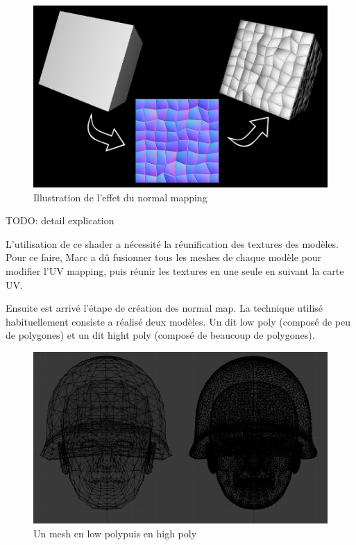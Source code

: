 \documentclass[11pt]{report}
\begin{document}
\begin{figure}[htbp]
\centering
\includegraphics[scale=0.30]{normal_mapping.jpg}
\caption{Illustration de l'effet du normal mapping}
\end{figure}

TODO: detail explication

L’utilisation de ce shader a nécessité la réunification des textures des modèles.
Pour ce faire, Marc a dû fusionner tous les meshes de chaque modèle pour modifier l’UV mapping, puis réunir les textures en une seule en suivant la carte UV.

Ensuite est arrivé l’étape de création des normal map. La technique utilisé habituellement consiste a réalisé deux modèles. Un dit low poly (composé de peu de polygones) et un dit hight poly (composé de beaucoup de polygones).

\begin{figure}[htbp]
\centering
\includegraphics[scale=0.22]{lowpoly_vs_highpoly.png}
\caption{Un mesh en low polypuis en high poly}
\end{figure}
\end{document}
